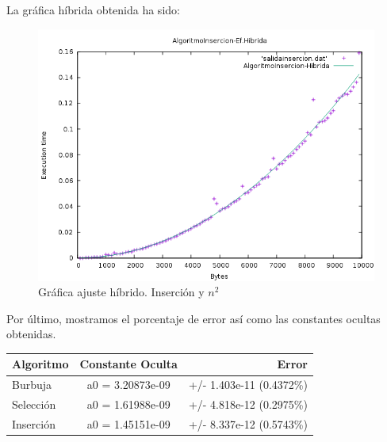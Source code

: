 La gráfica híbrida obtenida ha sido:
\begin{figure}[H]
	\centering
	\includegraphics[scale=0.5]{imagenes/algoritmoInsercion-hibrida}
	\caption{Gráfica ajuste híbrido. Inserción y $n^2$}
	\label{fig:E7}
\end{figure}
Por último, mostramos el porcentaje de error así como las constantes ocultas obtenidas.\\
\begin{center}
	\begin{tabular}{| l | c | r |}
		\hline
		\textbf{Algoritmo} & \textbf{Constante Oculta} & \textbf{Error} \\
		\hline
		Burbuja & a0 = 3.20873e-09 & +/- 1.403e-11 (0.4372\%)\\ \hline
		Selección & a0 = 1.61988e-09 & +/- 4.818e-12 (0.2975\%) \\ \hline		
		Inserción & a0 = 1.45151e-09 &  +/- 8.337e-12    (0.5743\%) \\ \hline
	\end{tabular}
\end{center}


